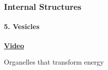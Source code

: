 \documentclass[10pt]{beamer}
\begin{document}
\begin{frame}
\frametitle{Internal Structures}
\framesubtitle{5. Vesicles}

	
	\begin{center}
		\href{http://www.sumanasinc.com/webcontent/animations/content/vesiclebudding.html}{\LARGE{\textbf{Video}}}
	\end{center}

\end{frame}


\begin{frame}
	
	\begin{center}
		\LARGE{\textcolor{myblue}{Organelles that transform energy}}\normalsize{}\\
	\end{center}

\end{frame}
\end{document}
